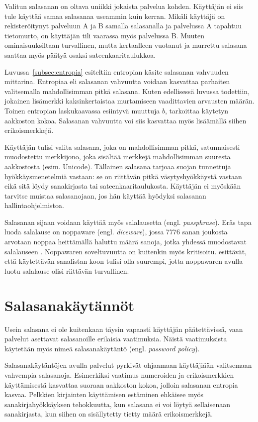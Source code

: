 Valitun salasanan on oltava uniikki jokaista palvelua kohden. Käyttäjän ei siis tule käyttää samaa salasanaa useammin kuin kerran. Mikäli käyttäjä on rekisteröitynyt palveluun A ja B samalla salasanalla ja palvelussa A tapahtuu tietomurto, on käyttäjän tili vaarassa myös palvelussa B. Muuten ominaisuuksiltaan turvallinen, mutta kertaalleen vuotanut ja murrettu salasana saattaa myös päätyä osaksi sateenkaaritaulukkoa.

Luvussa~\ref{subsec:entropia} esiteltiin entropian käsite salasanan vahvuuden mittarina. Entropiaa eli salasanan vahvuutta voidaan kasvattaa parhaiten valitsemalla mahdollisimman pitkä salasana. Kuten edellisessä luvussa todettiin, jokainen lisämerkki kaksinkertaistaa murtamiseen vaadittavien arvausten määrän. Toinen entropian laskukaavassa esiintyvä muuttuja $b$, tarkoittaa käytetyn aakkoston kokoa. Salasanan vahvuutta voi siis kasvattaa myös lisäämällä siihen erikoismerkkejä.

Käyttäjän tulisi valita salasana, joka on mahdollisimman pitkä, satunnaisesti muodostettu merkkijono, joka sisältää merkkejä mahdollisimman suuresta aakkostosta (esim. Unicode). Tällainen salasana tarjoaa suojan tunnettuja hyökkäysmenetelmiä vastaan: se on riittävän pitkä väsytyshyökkäystä vastaan eikä sitä löydy sanakirjasta tai sateenkaaritaulukosta. Käyttäjän ei myöskään tarvitse muistaa salasanojaan, jos hän käyttää hyödyksi salasanan hallintaohjelmistoa.

Salasanan sijaan voidaan käyttää myös salalausetta (engl. \textit{passphrase}). Eräs tapa luoda salalause on noppaware (engl. \textit{diceware}), jossa 7776 sanan joukosta arvotaan noppaa heittämällä haluttu määrä sanoja, jotka yhdessä muodostavat salalauseen \citep{reinhold_diceware_2022}. Noppawaren soveltuvuutta on kuitenkin myös kritisoitu. \citet{antonov_security_2020} esittävät, että käytettävän sanalistan koon tulisi olla suurempi, jotta noppawaren avulla luotu salalause olisi riittävän turvallinen.

\section{Salasanakäytännöt\label{sec:salasanakaytannot}}

Usein salasana ei ole kuitenkaan täysin vapaasti käyttäjän päätettävissä, vaan palvelut asettavat salasanoille erilaisia vaatimuksia. Näistä vaatimuksista käytetään myös nimeä salasanakäytäntö (engl. \textit{password policy}).

Salasanakäytäntöjen avulla palvelut pyrkivät ohjaamaan käyttäjiään valitsemaan vahvempia salasanoja. Esimerkiksi vaatimus numeroiden ja erikoismerkkien käyttämisestä kasvattaa suoraan aakkoston kokoa, jolloin salasanan entropia kasvaa. Pelkkien kirjainten käyttämisen estäminen ehkäisee myös sanakirjahyökkäyksen tehokkuutta, kun salasana ei voi löytyä sellaisenaan sanakirjasta, kun siihen on sisällytetty tietty määrä erikoismerkkejä.

